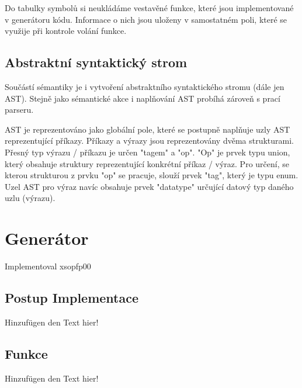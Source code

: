\documentclass[11pt,a4paper]{article}
\begin{document}
    Do tabulky symbolů si neukládáme vestavěné funkce, které jsou implementované v generátoru kódu. Informace o nich jsou uloženy v samostatném poli, které se využije při kontrole volání funkce.
    
    \subsection{Abstraktní syntaktický strom}
    Součástí sémantiky je i vytvoření abstraktního syntaktického stromu (dále jen AST). Stejně jako sémantické akce i naplňování AST probíhá zároveň s prací parseru.
    
    AST je reprezentováno jako globální pole, které se postupně naplňuje uzly AST reprezentující příkazy. Příkazy a výrazy jsou reprezentovány dvěma strukturami. Přesný typ výrazu / příkazu je určen "tagem" a "op". "Op" je prvek typu union, který obsahuje struktury reprezentující konkrétní příkaz / výraz. Pro určení, se kterou strukturou z prvku "op" se pracuje, slouží prvek "tag", který je typu enum. Uzel AST pro výraz navíc obsahuje prvek "datatype" určující datový typ daného uzlu (výrazu). \cite{AST:AST_in_C}
    
	\newpage


\section{Generátor}
    Implementoval xsopfp00

    \subsection{Postup Implementace}
    \noindent Hinzufügen den Text hier!

    \subsection{Funkce}
    \noindent Hinzufügen den Text hier!

    \newpage
    
\end{document}
